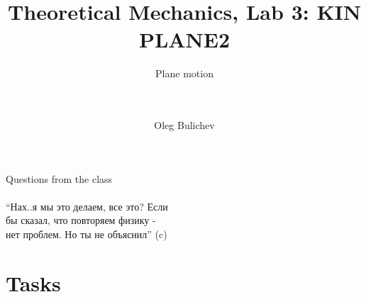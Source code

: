 \documentclass[aspectratio=169]{beamer}
\title[Theoretical Mechanics]{Theoretical Mechanics, Lab 3: KIN PLANE2} %
\subtitle{Plane motion
\\ \ \\ \ 
         } %
\author{Oleg Bulichev}
\newcommand{\fbckg}[1]{\usebackgroundtemplate{\texttt{[image: \#1]}}}%
\begin{document}
\setlength{\abovedisplayskip}{0pt}
\setlength{\belowdisplayskip}{0pt}
\setlength{\abovedisplayshortskip}{0pt}
\setlength{\belowdisplayshortskip}{0pt}

\fbckg{fibeamer/figs/title_page.png}

\fbckg{fibeamer/figs/common.png}

\begin{frame}[t]{Questions from the class
    }
\framesubtitle{}
\vfill
\begin{center}
    “Нах..я мы это делаем, все это? Если \\
    бы сказал, что повторяем физику - \\
    нет проблем. Но ты не объяснил” (c)
\end{center}
\vfill
\end{frame}

\section*{Tasks}
\end{document}
